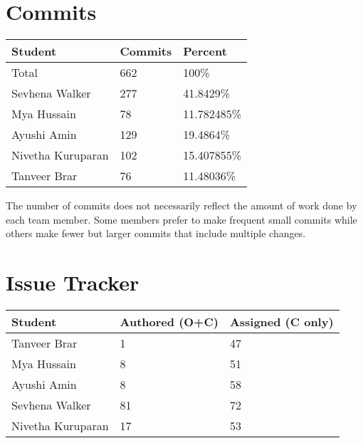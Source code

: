 \documentclass{article}
\begin{document}

\section{Commits}


\begin{table}[H]
  \centering
  \begin{tabular}{lll}
    \toprule
    \textbf{Student} & \textbf{Commits} & \textbf{Percent}\\
    \midrule
    Total & 662 & 100\% \\
    Sevhena Walker & 277 & 41.8429\% \\
    Mya Hussain & 78 & 11.782485\% \\
    Ayushi Amin & 129 & 19.4864\% \\
    Nivetha Kuruparan & 102 & 15.407855\% \\
    Tanveer Brar & 76 & 11.48036\% \\
    \bottomrule
  \end{tabular}
\end{table}

The number of commits does not necessarily reflect the amount of work done by each team member. Some members prefer to make frequent small commits while others make fewer but larger commits that include multiple changes.

\section{Issue Tracker}


\begin{table}[H]
\centering
\begin{tabular}{lll}
\toprule
\textbf{Student} & \textbf{Authored (O+C)} & \textbf{Assigned (C only)}\\
\midrule
Tanveer Brar & 1 & 47 \\
Mya Hussain & 8 & 51 \\
Ayushi Amin & 8 & 58 \\
Sevhena Walker & 81 & 72 \\
Nivetha Kuruparan & 17 & 53 \\
\bottomrule
\end{tabular}
\end{table}
\end{document}
